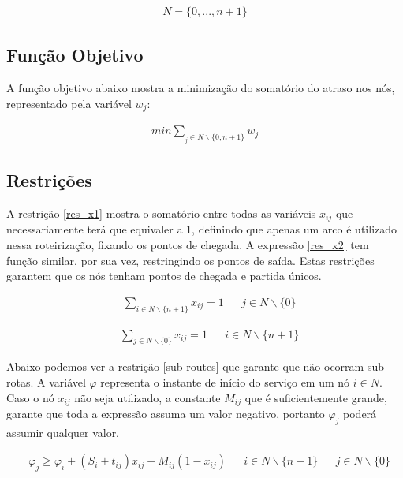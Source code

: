 \documentclass[12pt]{article}
\begin{document}
\begin{align}
  N = \{0, ..., n+1\} \label{nodes}
\end{align}

\subsection{Função Objetivo}

A função objetivo abaixo mostra a minimização do somatório do atraso nos nós, representado pela variável $w_j$:

\begin{align}
  min        \sum_{_j\in N\backslash \{0,n+1\}} w_j \label{obj_func}
\end{align}

\subsection{Restrições}

A restrição \eqref{res_x1} mostra o somatório entre todas as variáveis $x_{ij}$ que necessariamente terá que equivaler a 1, definindo que apenas um arco é utilizado nessa roteirização, fixando os pontos de chegada. A expressão \eqref{res_x2} tem função similar, por sua vez, restringindo os pontos de saída. Estas restrições garantem que os nós tenham pontos de chegada e partida únicos.


\begin{align}
   & \sum_{i\in N\backslash \{n+1\}} x_{ij} = 1 &  & j\in N\backslash \{0\} \label{res_x1}
\end{align}

\begin{align}
   & \sum_{j\in N\backslash \{0\}} x_{ij} = 1 &  & i\in N\backslash \{n+1\} \label{res_x2}
\end{align}

Abaixo podemos ver a restrição \eqref{sub-routes} que garante que não ocorram sub-rotas. A variável $\varphi$ representa o instante de início do serviço em um nó $i \in N$. Caso o nó $x_{ij}$ não seja utilizado, a constante $M_{ij}$ que é suficientemente grande, garante que toda a expressão assuma um valor negativo, portanto $\varphi_j$ poderá assumir qualquer valor.

\begin{align}
   & \varphi_j \geq \varphi_i + (S_i + t_{ij})x_{ij} - M_{ij}(1-x_{ij}) &  & i\in N\backslash \{n+1\} &  & j\in N\backslash \{0\} \label{sub-routes}
\end{align}
\end{document}

